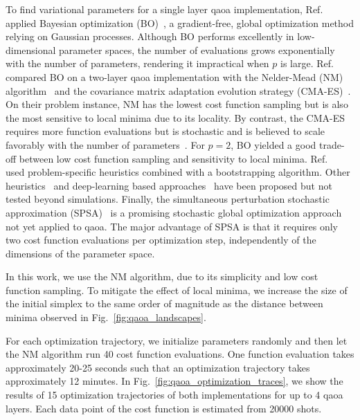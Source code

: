 To find variational parameters for a single layer \gls{qaoa} implementation, Ref.~\cite{Otterbach2017UnsupervisedComputer} applied Bayesian optimization (BO)~\cite{Mockus1989GlobalApproach}, a gradient-free, global optimization method relying on Gaussian processes. Although BO performs excellently in low-dimensional parameter spaces, the number of evaluations grows exponentially with the number of parameters, rendering it impractical when $p$ is large. Ref.~\cite{Bengtsson2019QuantumProcessor} compared BO on a two-layer \gls{qaoa} implementation with the Nelder-Mead (NM) algorithm~\cite{Nelder1965AMinimization} and the covariance matrix adaptation evolution strategy (CMA-ES)~\cite{Hansen2016TheTutorial}. On their problem instance, NM has the lowest cost function sampling but is also the most sensitive to local minima due to its locality. By contrast, the CMA-ES requires more function evaluations but is stochastic and is believed to scale favorably with the number of parameters~\cite{Bengtsson2019QuantumProcessor}. For $p=2$, BO yielded a good trade-off between low cost function sampling and sensitivity to local minima. 
Ref.~\cite{Pagano2019QuantumSimulator} used problem-specific heuristics combined with a bootstrapping algorithm. Other heuristics~\cite{ZhouQuantumDevices} and deep-learning based approaches~\cite{Verdon2019LearningNetworks} have been proposed but not tested beyond simulations. Finally, the simultaneous perturbation stochastic approximation (SPSA)~\cite{Bhatnagar2013StochasticOptimization} is a promising stochastic global optimization approach not yet applied to \gls{qaoa}. The major advantage of SPSA is that it requires only two cost function evaluations per optimization step, independently of the dimensions of the parameter space.

In this work, we use the NM algorithm, due to its simplicity and low cost function sampling. To mitigate the effect of local minima, we increase the size of the initial simplex to the same order of magnitude as the distance between minima observed in Fig.~\ref{fig:qaoa_landscapes}.

 For each optimization trajectory, we initialize parameters randomly and then let the NM algorithm run 40 cost function evaluations. One function evaluation takes approximately 20-25 seconds such that an optimization trajectory takes approximately 12 minutes. In Fig.~\ref{fig:qaoa_optimization_traces}, we show the results of 15 optimization trajectories of both implementations for up to 4 \gls{qaoa} layers. Each data point of the cost function is estimated from 20000 shots. 

